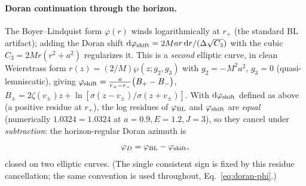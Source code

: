 \documentclass[12pt]{iopart}
\newcommand{\rp}{r_{+}}
\newcommand{\dd}{\mathrm{d}}
\begin{document}
\paragraph{Doran continuation through the horizon.} The Boyer--Lindquist form
$\varphi(r)$ winds logarithmically at $\rp$ (the standard BL artifact); adding the
Doran shift $\dd\varphi_{\rm shift}=2Mar\,\dd r/(\Delta\sqrt{C_3})$ with the cubic
$C_3=2Mr(r^2+a^2)$ regularizes it. This is a \emph{second} elliptic curve, in
clean Weierstrass form $r(z)=(2/M)\wp(z;g_2,g_3)$ with $g_2=-M^2a^2$, $g_3=0$
(quasi-lemniscatic), giving
$\varphi_{\rm shift}=\tfrac{a}{r_+-r_-}\big(B_+-B_-\big)$,
$B_\pm=2\zeta(v_\pm)z+\ln[\sigma(z-v_\pm)/\sigma(z+v_\pm)]$. With
$\dd\varphi_{\rm shift}$ defined as above (a positive residue at $\rp$), the
log residues of $\varphi_{\rm BL}$ and $\varphi_{\rm shift}$ are \emph{equal}
(numerically $1.0324=1.0324$ at $a=0.9,E=1.2,J=3$), so they cancel under
\emph{subtraction}: the horizon-regular Doran azimuth is
\begin{equation}
    \varphi_D=\varphi_{\rm BL}-\varphi_{\rm shift},
    \label{eq:doran-phi}
\end{equation}
closed on two elliptic curves. (The single consistent sign is fixed by this
residue cancellation; the same convention is used throughout,
Eq.~\eqref{eq:doran-phi}.)
\end{document}
